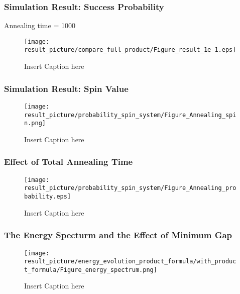 \documentclass{beamer}
\begin{document}
\begin{frame}
	\frametitle{Simulation Result: Success Probability}
	Annealing time = 1000
	\begin{figure}
		\centering
		\texttt{[image: result\_picture/compare\_full\_product/Figure\_result\_1e-1.eps]}

		\caption{Insert Caption here}
	\end{figure}
\end{frame}

\begin{frame}
	\frametitle{Simulation Result: Spin Value}
	\begin{figure}
		\centering
		\texttt{[image: result\_picture/probability\_spin\_system/Figure\_Annealing\_spin.png]}
		\caption{Insert Caption here}
	\end{figure}
\end{frame}

\begin{frame}
	\frametitle{Effect of Total Annealing Time}
	\begin{figure}
		\centering
		\texttt{[image: result\_picture/probability\_spin\_system/Figure\_Annealing\_probability.eps]}
		
		\caption{Insert Caption here}
	\end{figure}
\end{frame}

\begin{frame}
	\frametitle{The Energy Specturm and the Effect of Minimum Gap}
	\begin{figure}
		\centering
		\texttt{[image: result\_picture/energy\_evolution\_product\_formula/with\_product\_formula/Figure\_energy\_spectrum.png]}
		
		\caption{Insert Caption here}
	\end{figure}
\end{frame}
\end{document}
